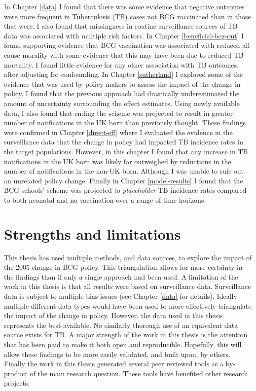 \documentclass[11pt,twoside]{bristolthesis}
\begin{document}
  In Chapter \ref{data} I found that there was some evidence that negative outcomes were more frequent in Tuberculosis (TB) cases not BCG vaccinated than in those that were. I also found that missingness in routine surveillance sources of TB data was associated with multiple risk factors. In Chapter \ref{beneficial-bcg-out} I found supporting evidence that BCG vaccination was associated with reduced all-cause morality with some evidence that this may have been due to reduced TB mortality. I found little evidence for any other association with TB outcomes, after adjusting for confounding. In Chapter \ref{sutherland} I explored some of the evidence that was used by policy makers to assess the impact of the change in policy. I found that the previous approach had drastically underestimated the amount of uncertainty surrounding the effect estimates. Using newly available data, I also found that ending the scheme was projected to result in greater number of notifications in the UK born than previously thought. These findings were confirmed in Chapter \ref{direct-eff} where I evaluated the evidence in the surveillance data that the change in policy had impacted TB incidence rates in the target populations. However, in this chapter I found that any increase in TB notifications in the UK born was likely far outweighed by reductions in the number of notifications in the non-UK born. Although I was unable to rule out an unrelated policy change. Finally in Chapter \ref{model-results} I found that the BCG schools' scheme was projected to \emph{placeholder} TB incidence rates compared to both neonatal and no vaccination over a range of time horizons.
  
  \hypertarget{strengths-and-limitations}{%
  \section{Strengths and limitations}\label{strengths-and-limitations}}
  
  This thesis has used multiple methods, and data sources, to explore the impact of the 2005 change in BCG policy. This triangulation allows for more certainty in the findings than if only a single approach had been used. A limitation of the work in this thesis is that all results were based on surveillance data. Surveillance data is subject to multiple bias issues (see Chapter \ref{data} for details). Ideally multiple different data types would have been used to more effectively triangulate the impact of the change in policy. However, the data used in this thesis represents the best available. No similarly thorough use of an equivalent data source exists for TB. A major strength of the work in this thesis is the attention that has been paid to make it both open and reproducible. Hopefully, this will allow these findings to be more easily validated, and built upon, by others. Finally the work in this thesis generated several peer reviewed tools as a by-product of the main research question. These tools have benefited other research projects.
  
\end{document}

